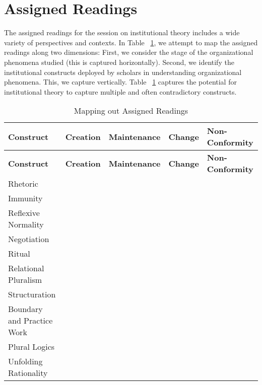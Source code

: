 \documentclass[12pt]{article}
\begin{document}
\newpage
\section{Assigned Readings}
The assigned readings for the session on institutional theory includes a wide variety of perspectives and contexts. In Table ~\ref{assigned}, we attempt to map the assigned readings along two dimensions: First, we consider the stage of the organizational phenomena studied (this is captured horizontally). Second, we identify the institutional constructs deployed by scholars in understanding organizational phenomena. This, we capture vertically. Table ~\ref{assigned} captures the potential for institutional theory to capture multiple and often contradictory constructs.

\begin{center}
 \begin{longtable}{|p{}|p{}|p{}|p{}|p{}|}
 \caption{Mapping out Assigned Readings\label{assigned}}\\
 
 \hline\textbf{Construct}&\textbf{Creation}&\textbf{Maintenance}&\textbf{Change}&\textbf{Non-Conformity}\\\hline
 \endfirsthead
 
 \hline\textbf{Construct}&\textbf{Creation}&\textbf{Maintenance}&\textbf{Change}&\textbf{Non-Conformity}\\\hline
 \endhead
 
 \hline
 \endfoot
 
 \hline
 \endlastfoot


Rhetoric&&\cite{Harmon2015}&\cite{Harmon2015}&\\\hline
Immunity&&&&\cite{Lepoutre2012}\\\hline
Reflexive Normality&&\cite{Lok2013}&&\\\hline
Negotiation&\cite{Helms2012}&&\cite{Lok2013}&\\\hline
Ritual&&\cite{Dacin2010}&&\\\hline
Relational Pluralism&&&\cite{Raffaelli2014}&\\\hline
Structuration&&\cite{Dimaggio1983}&&\\\hline
Boundary and Practice Work&&\cite{Zietsma2010}&\cite{Zietsma2010}&\cite{Zietsma2010}\\\hline
Plural Logics&&&\cite{Dunn2010}&\\\hline
Unfolding Rationality&&\cite{Quattrone2015}&\cite{Quattrone2015}&\\\hline
 \end{longtable}
 \end{center}
\end{document}

